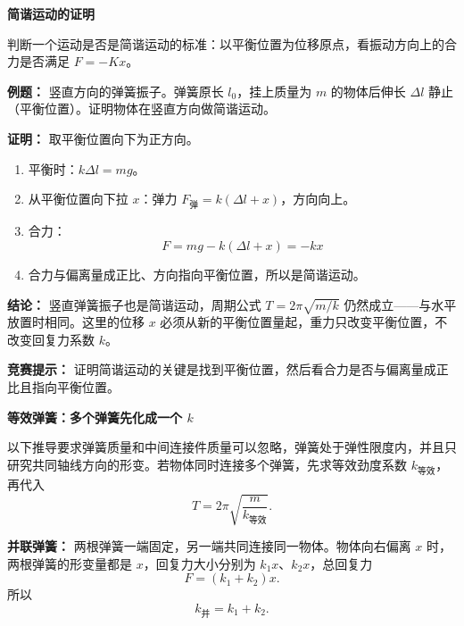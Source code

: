\begin{competitionbox}
\textbf{简谐运动的证明}

判断一个运动是否是简谐运动的标准：以平衡位置为位移原点，看振动方向上的合力是否满足 $F=-Kx$。

\textbf{例题：} 竖直方向的弹簧振子。弹簧原长 $l_0$，挂上质量为 $m$ 的物体后伸长 $\Delta l$ 静止（平衡位置）。证明物体在竖直方向做简谐运动。

\begin{center}


\label{fig:vertical-spring-shm}
\end{center}

\textbf{证明：} 取平衡位置向下为正方向。
\begin{enumerate}
  \item 平衡时：$k\Delta l = mg$。
  \item 从平衡位置向下拉 $x$：弹力 $F_{\text{弹}} = k(\Delta l + x)$，方向向上。
  \item 合力：
  \[
  F = mg - k(\Delta l + x) = -kx
  \]
  \item 合力与偏离量成正比、方向指向平衡位置，所以是简谐运动。
\end{enumerate}

\textbf{结论：} 竖直弹簧振子也是简谐运动，周期公式 $T = 2\pi\sqrt{m/k}$ 仍然成立——与水平放置时相同。这里的位移 $x$ 必须从新的平衡位置量起，重力只改变平衡位置，不改变回复力系数 $k$。

\textbf{竞赛提示：} 证明简谐运动的关键是找到平衡位置，然后看合力是否与偏离量成正比且指向平衡位置。

\medskip
\textbf{等效弹簧：多个弹簧先化成一个 $k$}

以下推导要求弹簧质量和中间连接件质量可以忽略，弹簧处于弹性限度内，并且只研究共同轴线方向的形变。若物体同时连接多个弹簧，先求等效劲度系数 $k_{\text{等效}}$，再代入
\[
T=2\pi\sqrt{\frac{m}{k_{\text{等效}}}}.
\]

\begin{center}


\label{fig:equivalent-springs}
\end{center}

\textbf{并联弹簧：} 两根弹簧一端固定，另一端共同连接同一物体。物体向右偏离 $x$ 时，两根弹簧的形变量都是 $x$，回复力大小分别为 $k_1x$、$k_2x$，总回复力
\[
F=(k_1+k_2)x.
\]
所以
\[
k_{\text{并}}=k_1+k_2.
\]


\end{competitionbox}
